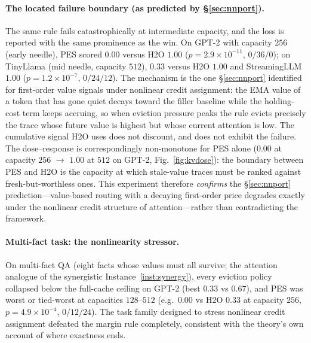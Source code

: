 \documentclass[10pt,twocolumn]{article}
\theoremstyle{definition}
\newcommand{\PES}{PES}
\begin{document}
\paragraph{The located failure boundary (as predicted by \S\ref{sec:nnport}).}
The same rule fails catastrophically at intermediate capacity, and the loss is reported with the same
prominence as the win. On {GPT-2} with capacity $256$ (early needle), \PES{} scored $0.00$ versus {H2O}
$1.00$ ($p{=}2.9{\times}10^{-11}$, $0/36/0$); on {TinyLlama} (mid needle, capacity $512$), $0.33$ versus
{H2O} $1.00$ and {StreamingLLM} $1.00$ ($p{=}1.2{\times}10^{-7}$, $0/24/12$). The mechanism is the one
\S\ref{sec:nnport} identified for first-order value signals under nonlinear credit assignment: the {EMA}
value of a token that has gone quiet decays toward the filler baseline while the holding-cost term keeps
accruing, so when eviction pressure peaks the rule evicts precisely the trace whose future value is highest
but whose current attention is low. The cumulative signal {H2O} uses does not discount, and does not
exhibit the failure. The dose--response is correspondingly non-monotone for \PES{} alone ($0.00$ at
capacity $256$ $\to$ $1.00$ at $512$ on {GPT-2}, Fig.~\ref{fig:kvdose}): the boundary between \PES{} and
{H2O} is the capacity at which stale-value traces must be ranked against fresh-but-worthless ones. This
experiment therefore \emph{confirms} the \S\ref{sec:nnport} prediction---value-based routing with a
decaying first-order price degrades exactly under the nonlinear credit structure of attention---rather
than contradicting the framework.

\paragraph{Multi-fact task: the nonlinearity stressor.}
On multi-fact {QA} (eight facts whose values must all survive; the attention analogue of the synergistic
Instance~\ref{inst:synergy}), every eviction policy collapsed below the full-cache ceiling on {GPT-2}
(best $0.33$ vs $0.67$), and \PES{} was worst or tied-worst at capacities $128$--$512$ (e.g.\ $0.00$ vs
{H2O} $0.33$ at capacity $256$, $p{=}4.9{\times}10^{-4}$, $0/12/24$). The task family designed to stress
nonlinear credit assignment defeated the margin rule completely, consistent with the theory's own account
of where exactness ends.
\end{document}
